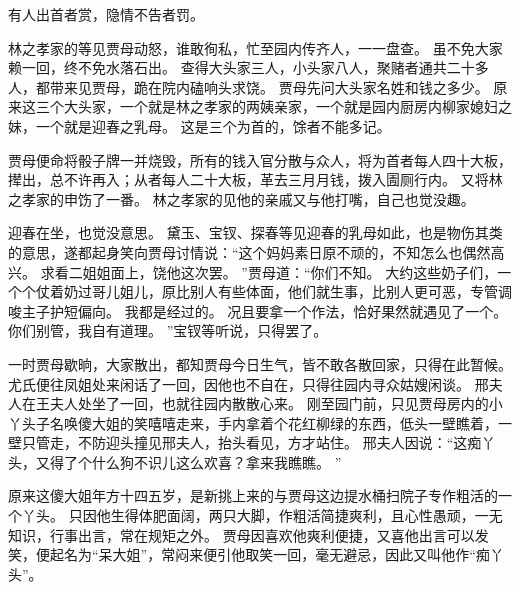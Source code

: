 有人出首者赏，隐情不告者罚。
\par
林之孝家的等见贾母动怒，谁敢徇私，忙至园内传齐人，一一盘查。
虽不免大家赖一回，终不免水落石出。
查得大头家三人，小头家八人，聚赌者通共二十多人，都带来见贾母，跪在院内磕响头求饶。
贾母先问大头家名姓和钱之多少。
原来这三个大头家，一个就是林之孝家的两姨亲家，一个就是园内厨房内柳家媳妇之妹，一个就是迎春之乳母。
这是三个为首的，馀者不能多记。
\par
贾母便命将骰子牌一并烧毁，所有的钱入官分散与众人，将为首者每人四十大板，撵出，总不许再入；从者每人二十大板，革去三月月钱，拨入圊厕行内。
又将林之孝家的申饬了一番。
林之孝家的见他的亲戚又与他打嘴，自己也觉没趣。
\par
迎春在坐，也觉没意思。
黛玉、宝钗、探春等见迎春的乳母如此，也是物伤其类的意思，遂都起身笑向贾母讨情说：“这个妈妈素日原不顽的，不知怎么也偶然高兴。
求看二姐姐面上，饶他这次罢。
”贾母道：“你们不知。
大约这些奶子们，一个个仗着奶过哥儿姐儿，原比别人有些体面，他们就生事，比别人更可恶，专管调唆主子护短偏向。
我都是经过的。
况且要拿一个作法，恰好果然就遇见了一个。
你们别管，我自有道理。
”宝钗等听说，只得罢了。
\par
一时贾母歇晌，大家散出，都知贾母今日生气，皆不敢各散回家，只得在此暂候。
尤氏便往凤姐处来闲话了一回，因他也不自在，只得往园内寻众姑嫂闲谈。
邢夫人在王夫人处坐了一回，也就往园内散散心来。
刚至园门前，只见贾母房内的小丫头子名唤傻大姐的笑嘻嘻走来，手内拿着个花红柳绿的东西，低头一壁瞧着，一壁只管走，不防迎头撞见邢夫人，抬头看见，方才站住。
邢夫人因说：“这痴丫头，又得了个什么狗不识儿这么欢喜？拿来我瞧瞧。
”\par
原来这傻大姐年方十四五岁，是新挑上来的与贾母这边提水桶扫院子专作粗活的一个丫头。
只因他生得体肥面阔，两只大脚，作粗活简捷爽利，且心性愚顽，一无知识，行事出言，常在规矩之外。
贾母因喜欢他爽利便捷，又喜他出言可以发笑，便起名为“呆大姐”，常闷来便引他取笑一回，毫无避忌，因此又叫他作“痴丫头”。
